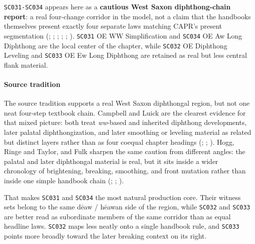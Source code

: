 \documentclass[
  british,
  a4paper,
]{article}
\begin{document}
\texttt{SC031-SC034} appears here as a \textbf{cautious West Saxon
diphthong-chain report}: a real four-change corridor in the model, not a
claim that the handbooks themselves present exactly four separate laws
matching CAPR's present segmentation
(;
;
;
; ; ). \texttt{SC031} OE WW Simplification and \texttt{SC034} OE
Aw Long Diphthong are the local center of the chapter, while
\texttt{SC032} OE Diphthong Leveling and \texttt{SC033} OE Ew Long
Diphthong are retained as real but less central flank material.

\paragraph{Source tradition}\label{source-tradition-22}

The source tradition supports a real West Saxon diphthongal region, but
not one neat four-step textbook chain. Campbell and Luick are the
clearest evidence for that mixed picture: both treat \emph{ww}-based and
inherited diphthong developments, later palatal diphthongization, and
later smoothing or leveling material as related but distinct layers
rather than as four coequal chapter headings
(;
;
). Hogg, Ringe and Taylor, and Fulk sharpen the same
caution from different angles: the palatal and later diphthongal
material is real, but it sits inside a wider chronology of brightening,
breaking, smoothing, and front mutation rather than inside one simple
handbook chain (;
; ).

That makes \texttt{SC031} and \texttt{SC034} the most natural production
core. Their witness sets belong to the same dēaw / hēawan side of the
region, while \texttt{SC032} and \texttt{SC033} are better read as
subordinate members of the same corridor than as equal headline laws.
\texttt{SC032} maps less neatly onto a single handbook rule, and
\texttt{SC033} points more broadly toward the later breaking context on
its right.
\end{document}
